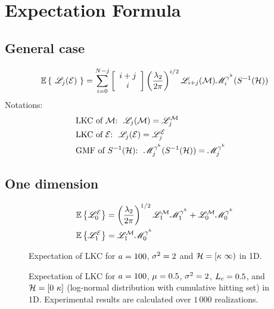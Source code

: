 \documentclass[12pt]{article}
\begin{document}
\newpage
\section{Expectation Formula}
\subsection{General case}
\begin{equation}
  \mathbb{E}\left\{\ \mathscr{L}_j(\mathcal{E}) \ \right\} = \sum_{i=0}^{N-j} \left[ \begin{array}{c}i+j\\i\end{array}\right]\left(\frac{\lambda_2}{2\pi}\right)^{i/2}\mathscr{L}_{i+j}(\mathcal{M})\mathscr{M}^{\gamma^k}_i(S^{-1}(\mathcal{H}))
\end{equation}
Notations:
  \begin{subequations}
    \begin{flalign}
      & \text{LKC of $\mathcal{M}$:} \ \ \mathscr{L}_j(\mathcal{M}) = \mathscr{L}_j^{\mathcal{M}} & \\
      & \text{LKC of $\mathcal{E}$:} \ \ \mathscr{L}_j(\mathcal{E}) = \mathscr{L}_j^{\mathcal{E}} & \\
      & \text{GMF of $S^{-1}(\mathcal{H})$:} \ \  \mathscr{M}^{\gamma^k}_j(S^{-1}(\mathcal{H})) = \mathscr{M}^{\gamma^k}_j
    \end{flalign}
  \end{subequations}
\subsection{One dimension}
\begin{subequations}
\begin{align}
  &\mathbb{E}\left\{\mathscr{L}_0^{\mathcal{E}}\right\} = \left(\frac{\lambda_2}{2\pi}\right)^{1/2}\mathscr{L}_1^{\mathcal{M}}\mathscr{M}^{\gamma^k}_1 + \mathscr{L}_0^{\mathcal{M}}\mathscr{M}^{\gamma^k}_0\\
  &\mathbb{E}\left\{\mathscr{L}_1^{\mathcal{E}}\right\} = \mathscr{L}_1^{\mathcal{M}}\mathscr{M}^{\gamma^k}_0
\end{align}
\end{subequations}


\begin{figure}[!h]
  \centering
  \hspace*{\fill}
  \hfill
  \subfigure[Length]{\scalebox{0.5}{}}\hspace*{\fill}
  \caption{Expectation of LKC for $a=100$, $\sigma^2=2$ and $\mathcal{H}=[\kappa\ \infty)$ in 1D.}
\end{figure}

\begin{figure}[!h]
  \centering
  \hspace*{\fill}
  \subfigure{\scalebox{0.5}{}}\hfill
  \subfigure{\scalebox{0.5}{}}\hspace*{\fill}
  \caption{Expectation of LKC for $a=100$, $\mu=0.5$, $\sigma^2=2$, $L_c=0.5$, and $\mathcal{H}=[0\ \kappa]$ (log-normal distribution with cumulative hitting set) in 1D. Experimental results are calculated over $1\,000$ realizations.}
\end{figure}
\end{document}
